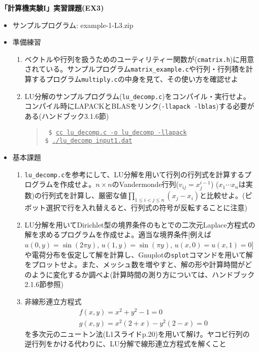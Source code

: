 \documentclass[11pt]{jarticle}
\begin{document}
\noindent
{\bf\large 「計算機実験I」実習課題(EX3)}
\\[-0.5em]

\noindent
\begin{itemize}
\item サンプルプログラム: example-1-L3.zip
  
\item 準備練習
  \begin{enumerate}
  \item ベクトルや行列を扱うためのユーティリティー関数が({\tt cmatrix.h})に用意されている。サンプルプログラム{\tt matrix\_example.c}や行列・行列積を計算するプログラム{\tt multiply.c}の中身を見て、その使い方を確認せよ
  \item LU分解のサンプルプログラム({\tt lu\_decomp.c})をコンパイル・実行せよ。コンパイル時にLAPACKとBLASをリンク({\tt -llapack -lblas})する必要がある(ハンドブック3.1.6節)
    \begin{quote} \tt
      \$ \underline{cc lu\_decomp.c -o lu\_decomp -llapack} \\
      \$ \underline{./lu\_decomp input1.dat}
    \end{quote}
  \end{enumerate}

\item 基本課題
  \begin{enumerate}
  \item {\tt lu\_decomp.c}を参考にして、LU分解を用いて行列の行列式を計算するプログラムを作成せよ。$n \times n$のVandermonde行列($v_{ij}=x_j^{i-1}$) ($x_1 \cdots x_n$は実数)の行列式を計算し、厳密な値$\displaystyle \prod_{1 \le i < j \le n} (x_j-x_i)$と比較せよ。(ピボット選択で行を入れ替えると、行列式の符号が反転することに注意)
  \item LU分解を用いてDirichlet型の境界条件のもとでの二次元Laplace方程式の解を求めるプログラムを作成せよ。適当な境界条件[例えば$u(0,y) = \sin(2 \pi y)$, $u(1,y) = \sin(\pi y)$, $u(x,0)=u(x,1)=0$]や電荷分布を仮定して解を計算し、Gnuplotの{\tt splot}コマンドを用いて解をプロットせよ。また、メッシュ数を増やすと、解の形や計算時間がどのように変化するか調べよ(計算時間の測り方については、ハンドブック2.1.6節参照)
  \item 非線形連立方程式
    \begin{align*}
      & f(x,y) = x^2 + y^2 - 1 = 0 \\
      & g(x,y) = x^2(2+x) - y^2 (2-x) = 0
    \end{align*}
    を多次元のニュートン法(L1スライドp.20)を用いて解け。ヤコビ行列の逆行列をかける代わりに、LU分解で線形連立方程式を解くこと
  \end{enumerate}
  

\end{itemize}
\end{document}
